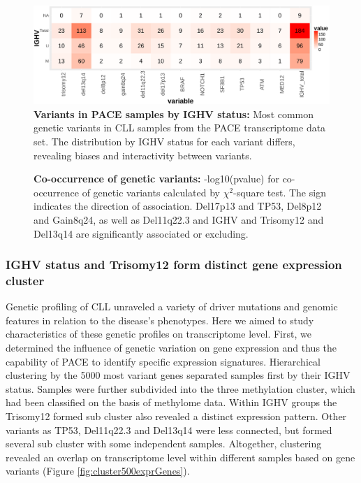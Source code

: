 \begin{figure}
	\centering
	\includegraphics[width=\columnwidth]{./Figures/datatable_overview.pdf}
	\caption{\textbf{Variants in PACE samples by IGHV status:} Most common genetic variants in CLL samples from the PACE transcriptome data set. The distribution by IGHV status for each variant differs, revealing biases and interactivity between variants.}
	\label{fig:tableOverview}
\end{figure}
         

\begin{figure}
	\centering
	\def\svgwidth{\columnwidth}
	
	\caption{\textbf{Co-occurrence of genetic variants:} -log10(pvalue) for co-occurrence of genetic variants calculated by $\chi^2$-square test. The sign indicates the direction of association. Del17p13 and TP53, Del8p12 and Gain8q24, as well as Del11q22.3 and IGHV and Trisomy12 and Del13q14 are significantly associated or excluding.}
	\label{fig:corplot_Chisquare}
\end{figure} 

\FloatBarrier

\subsubsection{IGHV status and Trisomy12 form distinct gene expression cluster}
Genetic profiling of CLL unraveled a variety of driver mutations and genomic features in relation to the disease's phenotypes. Here we aimed to study characteristics of these genetic profiles on transcriptome level. First, we determined the influence of genetic variation on gene expression and thus the capability of PACE to identify specific expression signatures. Hierarchical clustering by the 5000 most variant genes separated samples first by their IGHV status. Samples were further subdivided into the three methylation cluster, which had been classified on the basis of methylome data. Within IGHV groups the Trisomy12 formed sub cluster also revealed a distinct expression pattern. Other variants as TP53, Del11q22.3 and Del13q14 were less connected, but formed several sub cluster with some independent samples. Altogether, clustering revealed an overlap on transcriptome level within different samples based on gene variants (Figure \ref{fig:cluster500exprGenes}).

